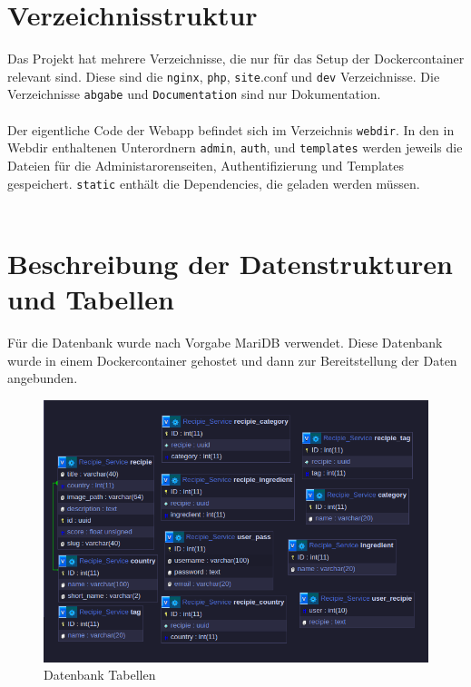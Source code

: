 \documentclass{article}
\begin{document}
\section{Verzeichnisstruktur}
Das Projekt hat mehrere Verzeichnisse, die nur für das Setup der Dockercontainer relevant sind. 
Diese sind die \verb|nginx|, \verb|php|, \verb|site|.conf und \verb|dev| Verzeichnisse. 
Die Verzeichnisse \verb|abgabe| und \verb|Documentation| sind nur Dokumentation.\\\\
Der eigentliche Code der Webapp befindet sich im Verzeichnis \verb|webdir|. 
In den in Webdir enthaltenen Unterordnern \verb|admin|, \verb|auth|, und \verb|templates| werden 
jeweils die Dateien für die Administarorenseiten, Authentifizierung und Templates gespeichert.
\verb|static| enthält die Dependencies, die geladen werden müssen.
\\
\\



\pagebreak
\section{Beschreibung der Datenstrukturen \newline und Tabellen}

Für die Datenbank wurde nach Vorgabe MariDB verwendet. Diese Datenbank wurde in einem Dockercontainer gehostet und dann zur Bereitstellung der Daten angebunden.

\begin{figure}[!hbt]
    \centering
    \includegraphics[scale=0.75, width=\textwidth]{Pictures/DB_Tables2.png}
    \caption{Datenbank Tabellen}
    \label{fig:sfig1}
\end{figure}
\end{document}
